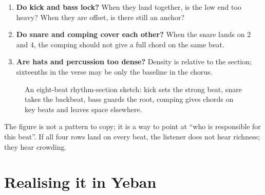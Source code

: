 \begin{enumerate}
\item \textbf{Do kick and bass lock?} When they land together, is the low end too heavy? When they are offset, is there still an anchor?
\item \textbf{Do snare and comping cover each other?} When the snare lands on 2 and 4, the comping should not give a full chord on the same beat.
\item \textbf{Are hats and percussion too dense?} Density is relative to the section; sixteenths in the verse may be only the baseline in the chorus.
\end{enumerate}

\begin{figure}[htbp]
  \centering
  \caption{An eight-beat rhythm-section sketch: kick sets the strong beat, snare takes the backbeat, bass guards the root, comping gives chords on key beats and leaves space elsewhere.}
  \label{fig:rhythm-grid}
\end{figure}

The figure is not a pattern to copy; it is a way to point at ``who is responsible for this beat''. If all four rows land on every beat, the listener does not hear richness; they hear crowding.

\section{Realising it in Yeban}
\label{sec:rhythm-yeban}

